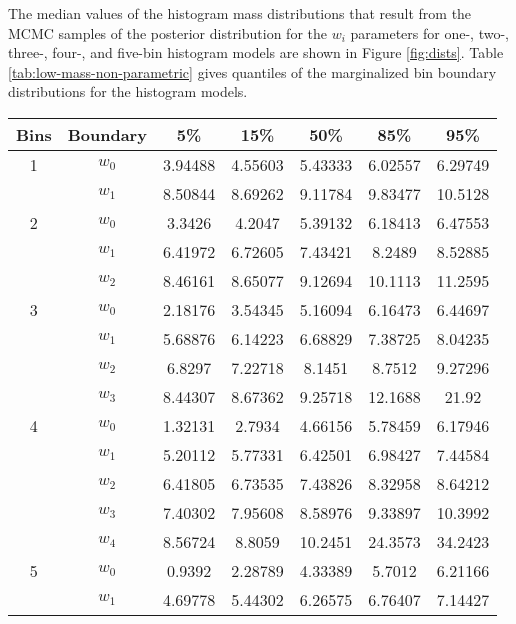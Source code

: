 \documentclass[preprint]{aastex}
\begin{document}
The median values of the histogram mass distributions that result from
the MCMC samples of the posterior distribution for the $w_i$
parameters for one-, two-, three-, four-, and five-bin histogram
models are shown in Figure \ref{fig:dists}.  Table
\ref{tab:low-mass-non-parametric} gives quantiles of the marginalized
bin boundary distributions for the histogram models.

\begin{table}
  \begin{center}
    \begin{tabular}{|c|c|c|c|c|c|c|}
      \hline
      Bins & Boundary & 5\% & 15\% & 50\% & 85\% & 95\% \\
      \hline \hline
      1 & $w_0$ & 3.94488 & 4.55603 & 5.43333 & 6.02557 & 6.29749 \\
      \hline
        & $w_1$ & 8.50844 & 8.69262 & 9.11784 & 9.83477 & 10.5128 \\
      \hline \hline
      2 & $w_0$ & 3.3426 & 4.2047 & 5.39132 & 6.18413 & 6.47553 \\
      \hline
        & $w_1$ & 6.41972 & 6.72605 & 7.43421 & 8.2489 & 8.52885 \\
      \hline
        & $w_2$ & 8.46161 & 8.65077 & 9.12694 & 10.1113 & 11.2595 \\
      \hline \hline
      3 & $w_0$ & 2.18176 & 3.54345 & 5.16094 & 6.16473 & 6.44697 \\
      \hline
        & $w_1$ & 5.68876 & 6.14223 & 6.68829 & 7.38725 & 8.04235 \\
      \hline
        & $w_2$ & 6.8297 & 7.22718 & 8.1451 & 8.7512 & 9.27296 \\
      \hline
        & $w_3$ & 8.44307 & 8.67362 & 9.25718 & 12.1688 & 21.92 \\
      \hline \hline
      4 & $w_0$ & 1.32131 & 2.7934 & 4.66156 & 5.78459 & 6.17946 \\
      \hline
        & $w_1$ & 5.20112 & 5.77331 & 6.42501 & 6.98427 & 7.44584 \\
      \hline
        & $w_2$ & 6.41805 & 6.73535 & 7.43826 & 8.32958 & 8.64212 \\
      \hline
        & $w_3$ & 7.40302 & 7.95608 & 8.58976 & 9.33897 & 10.3992 \\
      \hline
        & $w_4$ & 8.56724 & 8.8059 & 10.2451 & 24.3573 & 34.2423 \\
      \hline \hline
      5 & $w_0$ & 0.9392 & 2.28789 & 4.33389 & 5.7012 & 6.21166 \\
      \hline
        & $w_1$ & 4.69778 & 5.44302 & 6.26575 & 6.76407 & 7.14427 \\

\end{tabular}
\end{center}
\end{table}
\end{document}
